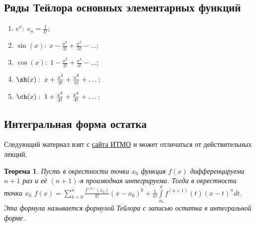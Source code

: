 \documentclass[a4paper,12pt]{article}
\newtheorem*{theorem}{Теорема}
\theoremstyle{remark}
\theoremstyle{definition}
\begin{document}
\subsection*{Ряды Тейлора основных элементарных функций}

\begin{enumerate}
    \item \(e^x:\; c_n = \frac{1}{k!}\);
    \item \(\sin(x):\; x - \frac{x^3}{3!} + \frac{x^5}{5!} - \dots\);
    \item \(\cos(x):\; 1 - \frac{x^2}{2!} + \frac{x^4}{4!} - \dots\);
    \item \(\sh(x):\; x + \frac{x^3}{3!} + \frac{x^5}{5!} + \dots\);
    \item \(\ch(x):\; 1 + \frac{x^2}{2!} + \frac{x^4}{4!} + \dots\);
\end{enumerate}

\subsection*{Интегральная форма остатка}
Следующий материал взят с \href{http://neerc.ifmo.ru/wiki/index.php?title=%D0%9E%D1%81%D1%82%D0%B0%D1%82%D0%BE%D0%BA_%D1%84%D0%BE%D1%80%D0%BC%D1%83%D0%BB%D1%8B_%D0%A2%D0%B5%D0%B9%D0%BB%D0%BE%D1%80%D0%B0_%D0%B2_%D0%B8%D0%BD%D1%82%D0%B5%D0%B3%D1%80%D0%B0%D0%BB%D1%8C%D0%BD%D0%BE%D0%B9_%D1%84%D0%BE%D1%80%D0%BC%D0%B5}{сайта ИТМО} и может отличаться от действительных лекций.

\begin{theorem}
    Пусть в окрестности точки \(x_0\) функция \(f(x)\) дифференцируема \(n + 1\) раз и её \((n + 1)\)-я производная интегрируема. Тогда в окрестности точки \(x_0\) \({f(x) = \sum\limits_{k = 0}^n \frac{f^{(k)} (x_0)}{k!}(x - x_0)^k + \frac1{n!} \int\limits_{x_0}^x f^{(n + 1)}(t) (x-t)^n dt}\). Эта формула называется формулой Тейлора с записью остатка в интегральной форме.
\end{theorem}
\end{document}

